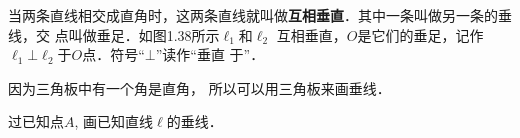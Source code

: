 当两条直线相交成直角时，这两条直线就叫做\textbf{互相垂直}．其中一条叫做另一条的垂线，交
点叫做垂足．如图1.38所示$\ell_1$和$\ell_2$
互相垂直，$O$是它们的垂足，记作
$\ell_1\bot \ell_2$于$O$点．符号“$\bot$”读作“垂直
于”．

\begin{figure}[htp]
	\centering
{}
	\caption{}
\end{figure}


因为三角板中有一个角是直角，
所以可以用三角板来画垂线．

\begin{example}
	过已知点$A$, 画已知直线$\ell$的垂线．
	
\end{example}

